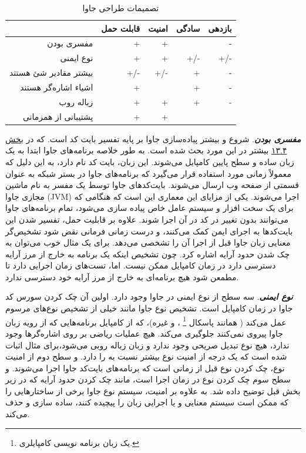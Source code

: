 \documentclass[a4paper,12pt]{report}
\begin{document}
	\begin{table}[h!t!]
		\begin{center}
			\captionsetup{justification=raggedleft,singlelinecheck=off}
			\caption{تصمیمات طراحی جاوا}
			\label{table1:chap13}
			\begin{tabular}{rrrrr}
				&قابلت حمل&امنیت&سادگی&بازدهی\\
				\hline
				مفسری بودن&+&+&&-\\
				نوع ایمنی&+&+&+/-&+/-\\
				بیشتر مقادیر شئ هستند&+/-&+/-&+&-\\
				اشیاء اشاره‌گر هستند&+&&+&-\\
				زباله روب&+&+&+&-\\
				پشتیبانی از همزمانی&+&+&&\\
				\hline
			\end{tabular}
		\end{center}
	\end{table}

	\textbf{\textit{
	مفسری بودن}}. شروع و بیشتر پیاده‌سازی جاوا بر پایه تفسیر بایت ‌کد
 است. که در 
	\hyperref[chap13]{
		بخش ۱۳.۴}	بیشتر در این مورد بحث شده است. به طور خلاصه برنامه‌های جاوا ابتدا به یک زبان ساده و سطح پایین کامپایل می‌شوند. این زبان، بایت کد نام دارد،‌ به این دلیل که معمولاً زمانی مورد استفاده قرار می‌گیرد که برنامه‌های جاوا در بستر شبکه به عنوان قسمتی از صفحه وب ارسال می‌شوند. بایت‌کد‌های جاوا توسط یک مفسر به نام ماشین مجازی جاوا (JVM)
	 اجرا می‌شوند. یکی از مزایای این معماری این است که هنگامی که 
	 برای یک سخت افزار و سیستم عامل خاص پیاده سازی می‌شود، تمام برنامه‌های جاوا می‌توانند بدون تغییر در کد در آن اجرا شوند. علاوه بر قابلیت حمل، تفسیر شدن این بایت‌کد‌ها به اجرای ایمن کمک می‌کنند،‌ و درست زمانی فرمانی نقض شود تشخیص‌گر معنایی زبان جاوا قبل از اجرا آن را تشخصی می‌دهد. برای یک مثال خوب می‌توان به چک شدن حدود آرایه اشاره کرد. چون تشخیص اینکه یک برنامه به خارج از مرز آرایه دسترسی دارد در زمان کامپایل ممکن نیست. اما، 
	 تست‌های زمان اجرایی دارد تا مطمعن شود هیچ برنامه‌ای به خارج از مرز آرایه خود دسترسی ندارد.

	\textbf{\textit{
	نوع ایمنی}}. سه سطح از نوع ایمنی در جاوا وجود دارد. اولین آن چک کردن سورس کد جاوا در زمان کامپایل است. تشخیص نوع جاوا مانند خیلی از تشخیص نوع‌های مرسوم عمل می‌کند ( همانند پاسکال
	\footnote{یک زبان برنامه نویسی کامپایلری.}
	، 
	و غیره)، که از کامپایل برنامه‌هایی که از رویه زبان جاوا پیروی نمی‌کنند جلوگیری می‌کند.
	هیچ عملیات ریاضی بر روی اشاره‌گرها وجود ندارد، هیچ نوع تبدیل صریحی وجود ندارد و زبان زباله روبی می‌شود،برای مثال اثبات شده است که یک درجه از امنیت نوع بیشتر نسبت به 
	را دارد. و سطح دوم از امنیت نوع، چک کردن نوع قبل از زمانی است که برنامه‌های بایت‌کد جاوا اجرا می‌شوند. و سطح سوم چک کردن نوع در زمان اجرا است، مانند چک کردن حدود آرایه که در زیر بخش قبل توضیح داده شد. به علاوه بر امنیت، سیستم نوع جاوا برخی از ساختار‌هایی را که ممکن است سیستم معنایی و یا اجرایی زبان را پیچیده کنند، ساده سازی و حذف می‌کند.
	
\end{document}
